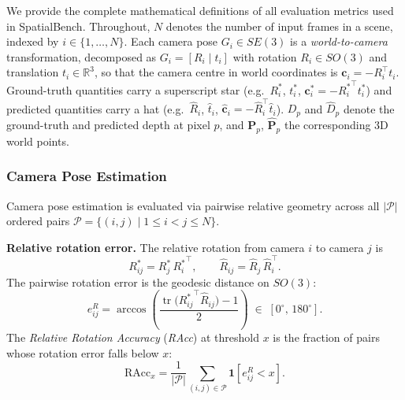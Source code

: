 \documentclass{llmxive}
\providecommand{\benchmark}{SpatialBench\xspace}
\begin{document}
We provide the complete mathematical definitions of all evaluation metrics used in \benchmark.
%
Throughout, $N$ denotes the number of input frames in a scene, indexed by $i\in\{1,\ldots,N\}$.
%
Each camera pose $G_i\in SE(3)$ is a \emph{world-to-camera} transformation, decomposed as $G_i=[R_i\mid t_i]$ with rotation $R_i\in SO(3)$ and translation $t_i\in\mathbb{R}^3$, so that the camera centre in world coordinates is $\mathbf{c}_i=-R_i^{\top}t_i$.
%
Ground-truth quantities carry a superscript star (e.g.\ $R_i^*$, $t_i^*$, $\mathbf{c}_i^*=-{R_i^*}^{\!\top}t_i^*$) and predicted quantities carry a hat (e.g.\ $\hat{R}_i$, $\hat{t}_i$, $\hat{\mathbf{c}}_i=-\hat{R}_i^{\top}\hat{t}_i$).
%
$D_p$ and $\hat{D}_p$ denote the ground-truth and predicted depth at pixel $p$, and $\mathbf{P}_p$, $\hat{\mathbf{P}}_p$ the corresponding 3D world points.

\subsubsection{Camera Pose Estimation}
\label{appendix:metrics:pose}

Camera pose estimation is evaluated via pairwise relative geometry across all $|\mathcal{P}|$ ordered pairs $\mathcal{P}=\{(i,j)\mid 1\!\le\!i\!<\!j\!\le\!N\}$.

\textbf{Relative rotation error.} The relative rotation from camera $i$ to camera $j$ is
\begin{equation}
  R_{ij}^{*} = R_j^{*}\,{R_i^{*}}^{\!\top},
  \qquad
  \hat{R}_{ij} = \hat{R}_j\,\hat{R}_i^{\top}.
\end{equation}
The pairwise rotation error is the geodesic distance on $SO(3)$:
\begin{equation}
  e^{R}_{ij}
  = \arccos\!\left(\frac{\operatorname{tr}\!\bigl({R_{ij}^{*}}^{\!\top}\hat{R}_{ij}\bigr)-1}{2}\right)
  \;\in\; [0^{\circ},\,180^{\circ}].
  \label{eq:rre}
\end{equation}
The \emph{Relative Rotation Accuracy} (\textit{RAcc}) at threshold $x$ is the fraction of pairs whose rotation error falls below $x$:
\begin{equation}
  \mathrm{RAcc}_{x}
  = \frac{1}{|\mathcal{P}|}\sum_{(i,j)\in\mathcal{P}}
    \mathbf{1}\!\left[e^{R}_{ij} < x\right].
  \label{eq:racc}
\end{equation}
\end{document}
